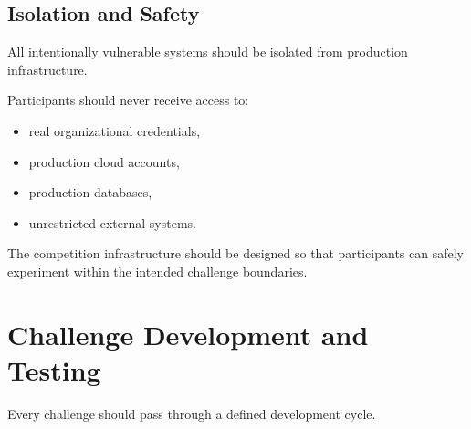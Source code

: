 \documentclass[11pt,a4paper]{article}
\begin{document}
\subsection{Isolation and Safety}

All intentionally vulnerable systems should be isolated from
production infrastructure.

Participants should never receive access to:

\begin{itemize}

    \item real organizational credentials,

    \item production cloud accounts,

    \item production databases,

    \item unrestricted external systems.

\end{itemize}

The competition infrastructure should be designed so that
participants can safely experiment within the intended challenge
boundaries.



\section{Challenge Development and Testing}

Every challenge should pass through a defined development cycle.
\end{document}
